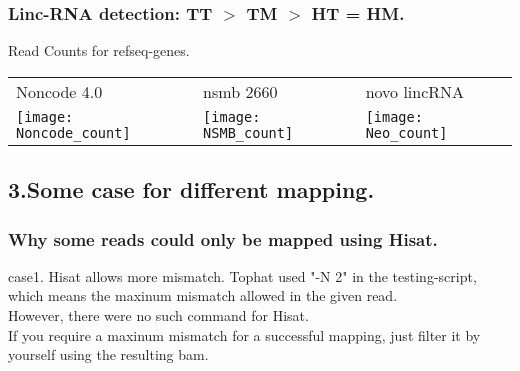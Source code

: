 \begin{frame}[c,fragile]
	\frametitle{ Linc-RNA detection: TT $>$ TM $>$ HT = HM. }
	\begin{block}{ Read Counts for refseq-genes. }
			\begin{table}
			\centering	
			\begin{tabular}{C{3cm} C{3cm} C{3cm}}     
				Noncode 4.0		& nsmb 2660 & novo lincRNA 	\\
				\texttt{[image: Noncode\_count]} &  
				\texttt{[image: NSMB\_count]}	 &
				\texttt{[image: Neo\_count]}	\\	
			\end{tabular}	
			\end{table}	
	\end{block}
\end{frame}



\subsection{3.Some case for different mapping.}

\begin{frame}[c,fragile]
	\frametitle{ Why some reads could only be mapped using Hisat. }
	\begin{block}{ case1. Hisat allows more mismatch.  }
		Tophat used \alert{"-N 2"} in the testing-script, which means the maxinum mismatch allowed in the given read. \\ \pause
		However, there were no such command for Hisat. \\ \pause
		If you require a maxinum mismatch for a successful mapping, just filter it by yourself using the resulting bam.
	\end{block}
\end{frame}


